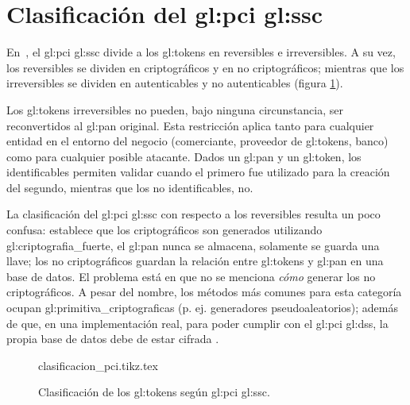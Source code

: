 \section{Clasificación del \texorpdfstring{\acrshort{gl:pci}}{PCI} %
\texorpdfstring{\acrshort{gl:ssc}}{SSC}}
\label{sec:pci_dss}

En~\cite{pci_tokens}, el \gls{gl:pci} \gls{gl:ssc} divide a los
\glspl{gl:token} en reversibles e irreversibles. A su vez, los reversibles se
dividen en criptográficos y en no criptográficos; mientras que los
irreversibles se dividen en autenticables y no autenticables (figura
\ref{fig:division_tokens}).

Los \glspl{gl:token} irreversibles no pueden, bajo ninguna circunstancia, ser
reconvertidos al \gls{gl:pan} original. Esta restricción aplica tanto para
cualquier entidad en el entorno del negocio (comerciante, proveedor de
\glspl{gl:token}, banco) como para cualquier posible atacante. Dados un
\gls{gl:pan} y un \gls{gl:token}, los identificables permiten validar cuando el
primero fue utilizado para la creación del segundo, mientras que los no
identificables, no.

La clasificación del \gls{gl:pci} \gls{gl:ssc} con respecto a los reversibles
resulta un poco confusa: establece que los criptográficos son generados
utilizando \gls{gl:criptografia_fuerte}, el \gls{gl:pan} nunca se almacena,
solamente se guarda una llave; los no criptográficos guardan la relación entre
\glspl{gl:token} y \gls{gl:pan} en una base de datos. El problema está en que
no se menciona \textit{cómo} generar los no criptográficos. A pesar del nombre,
los métodos más comunes para esta categoría ocupan
\glspl{gl:primitiva_criptografica} (p. ej. generadores pseudoaleatorios);
además de que, en una implementación real, para poder cumplir con el
\gls{gl:pci} \gls{gl:dss}, la propia base de datos debe de estar cifrada
\cite{pci_dss}.

\begin{figure}
  \begin{center}
    {clasificacion_pci.tikz.tex}
    \caption{Clasificación de los \glspl{gl:token}
      según \gls{gl:pci} \gls{gl:ssc}.}
    \label{fig:division_tokens}
  \end{center}
\end{figure}
